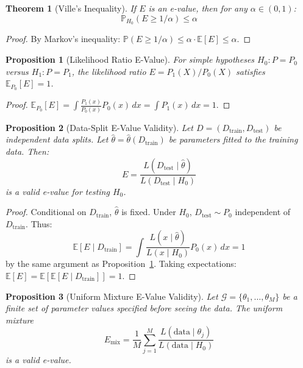 \documentclass[11pt,a4paper]{article}
\newtheorem{theorem}{Theorem}
\newtheorem{proposition}{Proposition}
\newcommand{\E}{\mathbb{E}}
\newcommand{\Prob}{\mathbb{P}}
\begin{document}
\begin{theorem}[Ville's Inequality]
\label{thm:ville}
If $E$ is an e-value, then for any $\alpha \in (0,1)$:
\begin{equation}
\Prob_{H_0}(E \geq 1/\alpha) \leq \alpha
\end{equation}
\end{theorem}

\begin{proof}
By Markov's inequality: $\Prob(E \geq 1/\alpha) \leq \alpha \cdot \E[E] \leq \alpha$.
\end{proof}

\begin{proposition}[Likelihood Ratio E-Value]
\label{prop:lr}
For simple hypotheses $H_0: P = P_0$ versus $H_1: P = P_1$, the likelihood ratio $E = P_1(X)/P_0(X)$ satisfies $\E_{P_0}[E] = 1$.
\end{proposition}

\begin{proof}
$\E_{P_0}[E] = \int \frac{P_1(x)}{P_0(x)} P_0(x) \, dx = \int P_1(x) \, dx = 1$.
\end{proof}

\begin{proposition}[Data-Split E-Value Validity]
\label{prop:split}
Let $D = (D_{\text{train}}, D_{\text{test}})$ be independent data splits. Let $\hat{\theta} = \hat{\theta}(D_{\text{train}})$ be parameters fitted to the training data. Then:
\begin{equation}
E = \frac{L(D_{\text{test}} \mid \hat{\theta})}{L(D_{\text{test}} \mid H_0)}
\end{equation}
is a valid e-value for testing $H_0$.
\end{proposition}

\begin{proof}
Conditional on $D_{\text{train}}$, $\hat{\theta}$ is fixed. Under $H_0$, $D_{\text{test}} \sim P_0$ independent of $D_{\text{train}}$. Thus:
\begin{equation}
\E[E \mid D_{\text{train}}] = \int \frac{L(x \mid \hat{\theta})}{L(x \mid H_0)} P_0(x) \, dx = 1
\end{equation}
by the same argument as Proposition~\ref{prop:lr}. Taking expectations: $\E[E] = \E[\E[E \mid D_{\text{train}}]] = 1$.
\end{proof}

\begin{proposition}[Uniform Mixture E-Value Validity]
\label{prop:mixture}
Let $\mathcal{G} = \{\theta_1, \ldots, \theta_M\}$ be a finite set of parameter values specified before seeing the data. The uniform mixture
\begin{equation}
E_{\text{mix}} = \frac{1}{M} \sum_{j=1}^M \frac{L(\text{data} \mid \theta_j)}{L(\text{data} \mid H_0)}
\end{equation}
is a valid e-value.
\end{proposition}
\end{document}
